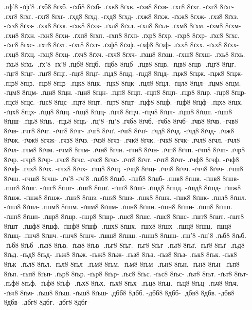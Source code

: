 {.ґф'8 -ґф'8
.ґхб8 8ґхб. -ґхб8 8ґхб-
.ґхв8 8ґхв. -ґхв8 8ґхв-
.ґхг8 8ґхг. -ґхг8 8ґхг-
.ґхґ8 8ґхґ. -ґхґ8 8ґхґ-
.ґхд8 8ґхд. -ґхд8 8ґхд-
.ґхж8 8ґхж. -ґхж8 8ґхж-
.ґхз8 8ґхз. -ґхз8 8ґхз-
.ґхк8 8ґхк. -ґхк8 8ґхк-
.ґхл8 8ґхл. -ґхл8 8ґхл-
.ґхм8 8ґхм. -ґхм8 8ґхм-
.ґхн8 8ґхн. -ґхн8 8ґхн-
.ґхп8 8ґхп. -ґхп8 8ґхп-
.ґхр8 8ґхр. -ґхр8 8ґхр-
.ґхс8 8ґхс. -ґхс8 8ґхс-
.ґхт8 8ґхт. -ґхт8 8ґхт-
.ґхф8 8ґхф. -ґхф8 8ґхф-
.ґхх8 8ґхх. -ґхх8 8ґхх-
.ґхц8 8ґхц. -ґхц8 8ґхц-
.ґхч8 8ґхч. -ґхч8 8ґхч-
.ґхш8 8ґхш. -ґхш8 8ґхш-
.ґхь8 8ґхь. -ґхь8 8ґхь-
.ґх'8 -ґх'8
.ґцб8 8ґцб. -ґцб8 8ґцб-
.ґцв8 8ґцв. -ґцв8 8ґцв-
.ґцг8 8ґцг. -ґцг8 8ґцг-
.ґцґ8 8ґцґ. -ґцґ8 8ґцґ-
.ґцд8 8ґцд. -ґцд8 8ґцд-
.ґцж8 8ґцж. -ґцж8 8ґцж-
.ґцз8 8ґцз. -ґцз8 8ґцз-
.ґцк8 8ґцк. -ґцк8 8ґцк-
.ґцл8 8ґцл. -ґцл8 8ґцл-
.ґцм8 8ґцм. -ґцм8 8ґцм-
.ґцн8 8ґцн. -ґцн8 8ґцн-
.ґцп8 8ґцп. -ґцп8 8ґцп-
.ґцр8 8ґцр. -ґцр8 8ґцр-
.ґцс8 8ґцс. -ґцс8 8ґцс-
.ґцт8 8ґцт. -ґцт8 8ґцт-
.ґцф8 8ґцф. -ґцф8 8ґцф-
.ґцх8 8ґцх. -ґцх8 8ґцх-
.ґцц8 8ґцц. -ґцц8 8ґцц-
.ґцч8 8ґцч. -ґцч8 8ґцч-
.ґцш8 8ґцш. -ґцш8 8ґцш-
.ґць8 8ґць. -ґць8 8ґць-
.ґц'8 -ґц'8
.ґчб8 8ґчб. -ґчб8 8ґчб-
.ґчв8 8ґчв. -ґчв8 8ґчв-
.ґчг8 8ґчг. -ґчг8 8ґчг-
.ґчґ8 8ґчґ. -ґчґ8 8ґчґ-
.ґчд8 8ґчд. -ґчд8 8ґчд-
.ґчж8 8ґчж. -ґчж8 8ґчж-
.ґчз8 8ґчз. -ґчз8 8ґчз-
.ґчк8 8ґчк. -ґчк8 8ґчк-
.ґчл8 8ґчл. -ґчл8 8ґчл-
.ґчм8 8ґчм. -ґчм8 8ґчм-
.ґчн8 8ґчн. -ґчн8 8ґчн-
.ґчп8 8ґчп. -ґчп8 8ґчп-
.ґчр8 8ґчр. -ґчр8 8ґчр-
.ґчс8 8ґчс. -ґчс8 8ґчс-
.ґчт8 8ґчт. -ґчт8 8ґчт-
.ґчф8 8ґчф. -ґчф8 8ґчф-
.ґчх8 8ґчх. -ґчх8 8ґчх-
.ґчц8 8ґчц. -ґчц8 8ґчц-
.ґчч8 8ґчч. -ґчч8 8ґчч-
.ґчш8 8ґчш. -ґчш8 8ґчш-
.ґч'8 -ґч'8
.ґшб8 8ґшб. -ґшб8 8ґшб-
.ґшв8 8ґшв. -ґшв8 8ґшв-
.ґшг8 8ґшг. -ґшг8 8ґшг-
.ґшґ8 8ґшґ. -ґшґ8 8ґшґ-
.ґшд8 8ґшд. -ґшд8 8ґшд-
.ґшж8 8ґшж. -ґшж8 8ґшж-
.ґшз8 8ґшз. -ґшз8 8ґшз-
.ґшк8 8ґшк. -ґшк8 8ґшк-
.ґшл8 8ґшл. -ґшл8 8ґшл-
.ґшм8 8ґшм. -ґшм8 8ґшм-
.ґшн8 8ґшн. -ґшн8 8ґшн-
.ґшп8 8ґшп. -ґшп8 8ґшп-
.ґшр8 8ґшр. -ґшр8 8ґшр-
.ґшс8 8ґшс. -ґшс8 8ґшс-
.ґшт8 8ґшт. -ґшт8 8ґшт-
.ґшф8 8ґшф. -ґшф8 8ґшф-
.ґшх8 8ґшх. -ґшх8 8ґшх-
.ґшц8 8ґшц. -ґшц8 8ґшц-
.ґшч8 8ґшч. -ґшч8 8ґшч-
.ґшш8 8ґшш. -ґшш8 8ґшш-
.ґш'8 -ґш'8
.ґьб8 8ґьб. -ґьб8 8ґьб-
.ґьв8 8ґьв. -ґьв8 8ґьв-
.ґьг8 8ґьг. -ґьг8 8ґьг-
.ґьґ8 8ґьґ. -ґьґ8 8ґьґ-
.ґьд8 8ґьд. -ґьд8 8ґьд-
.ґьж8 8ґьж. -ґьж8 8ґьж-
.ґьз8 8ґьз. -ґьз8 8ґьз-
.ґьк8 8ґьк. -ґьк8 8ґьк-
.ґьл8 8ґьл. -ґьл8 8ґьл-
.ґьм8 8ґьм. -ґьм8 8ґьм-
.ґьн8 8ґьн. -ґьн8 8ґьн-
.ґьп8 8ґьп. -ґьп8 8ґьп-
.ґьр8 8ґьр. -ґьр8 8ґьр-
.ґьс8 8ґьс. -ґьс8 8ґьс-
.ґьт8 8ґьт. -ґьт8 8ґьт-
.ґьф8 8ґьф. -ґьф8 8ґьф-
.ґьх8 8ґьх. -ґьх8 8ґьх-
.ґьц8 8ґьц. -ґьц8 8ґьц-
.ґьч8 8ґьч. -ґьч8 8ґьч-
.ґьш8 8ґьш. -ґьш8 8ґьш-
.дбб8 8дбб. -дбб8 8дбб-
.дбв8 8дбв. -дбв8 8дбв-
.дбг8 8дбг. -дбг8 8дбг-
}
